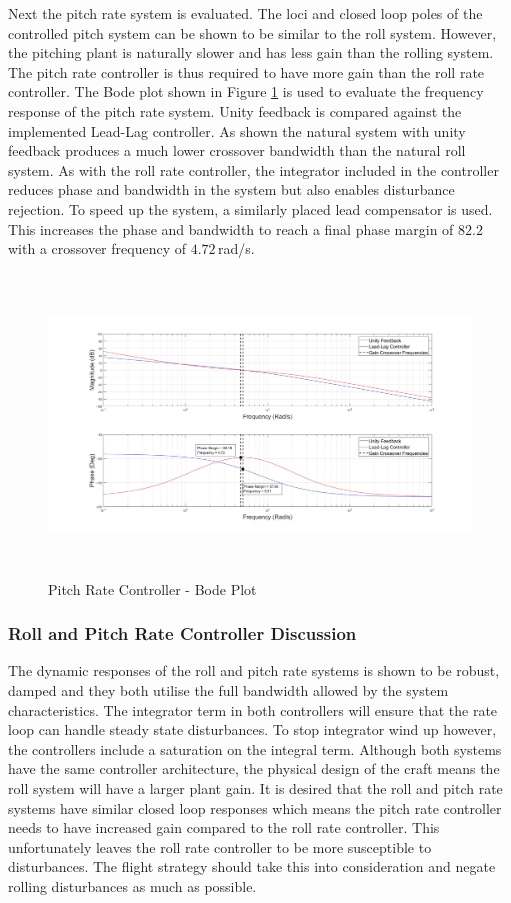 \documentclass[12pt]{report}
\begin{document}
Next the pitch rate system is evaluated. The loci and closed loop poles of the controlled pitch system can be shown to be similar to the roll system. However, the pitching plant is naturally slower and has less gain than the rolling system. The pitch rate controller is thus required to have more gain than the roll rate controller. The Bode plot shown in Figure \ref{IM_PitchRateControlBode} is used to evaluate the frequency response of the pitch rate system. Unity feedback is compared against the implemented Lead-Lag controller. As shown the natural system with unity feedback produces a much lower crossover bandwidth than the natural roll system. As with the roll rate controller, the integrator included in the controller reduces phase and bandwidth in the system but also enables disturbance rejection. To speed up the system, a similarly placed lead compensator is used. This increases the phase and bandwidth to reach a final phase margin of $82.2$\textdegree\,with a crossover frequency of $4.72$\,rad/s.

\begin{figure}[H]
	\centering
	\includegraphics[height = 8cm]{../Design/Matlab/Controllers/pitch_rate_bode.jpg}
	\caption{Pitch Rate Controller -  Bode Plot}
	\label{IM_PitchRateControlBode}
\end{figure}


\subsubsection{Roll and Pitch Rate Controller Discussion}
The dynamic responses of the roll and pitch rate systems is shown to be robust, damped and they both utilise the full bandwidth allowed by the system characteristics. The integrator term in both controllers will ensure that the rate loop can handle steady state disturbances. To stop integrator wind up however, the controllers include a saturation on the integral term. Although both systems have the same controller architecture, the physical design of the craft means the roll system will have a larger plant gain. It is desired that the roll and pitch rate systems have similar closed loop responses which means the pitch rate controller needs to have increased gain compared to the roll rate controller. This unfortunately leaves the roll rate controller to be more susceptible to disturbances. The flight strategy should take this into consideration and negate rolling disturbances as much as possible.
\end{document}
